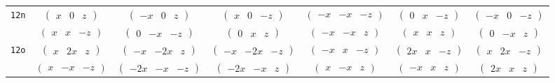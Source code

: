 \documentclass[fleqn,9pt,landscape]{jsarticle}
\begin{document}
\begin{center}
\begin{longtable}{ccccccc}
{\tt 12n} & $ \begin{pmatrix} x & 0 & z \end{pmatrix} $ & $ \begin{pmatrix} - x & 0 & z \end{pmatrix} $ & $ \begin{pmatrix} x & 0 & - z \end{pmatrix} $ & $ \begin{pmatrix} - x & - x & - z \end{pmatrix} $ & $ \begin{pmatrix} 0 & x & - z \end{pmatrix} $ & $ \begin{pmatrix} - x & 0 & - z \end{pmatrix} $ \\
& $ \begin{pmatrix} x & x & - z \end{pmatrix} $ & $ \begin{pmatrix} 0 & - x & - z \end{pmatrix} $ & $ \begin{pmatrix} 0 & x & z \end{pmatrix} $ & $ \begin{pmatrix} - x & - x & z \end{pmatrix} $ & $ \begin{pmatrix} x & x & z \end{pmatrix} $ & $ \begin{pmatrix} 0 & - x & z \end{pmatrix} $ \\ \hline
{\tt 12o} & $ \begin{pmatrix} x & 2 x & z \end{pmatrix} $ & $ \begin{pmatrix} - x & - 2 x & z \end{pmatrix} $ & $ \begin{pmatrix} - x & - 2 x & - z \end{pmatrix} $ & $ \begin{pmatrix} - x & x & - z \end{pmatrix} $ & $ \begin{pmatrix} 2 x & x & - z \end{pmatrix} $ & $ \begin{pmatrix} x & 2 x & - z \end{pmatrix} $ \\
& $ \begin{pmatrix} x & - x & - z \end{pmatrix} $ & $ \begin{pmatrix} - 2 x & - x & - z \end{pmatrix} $ & $ \begin{pmatrix} - 2 x & - x & z \end{pmatrix} $ & $ \begin{pmatrix} x & - x & z \end{pmatrix} $ & $ \begin{pmatrix} - x & x & z \end{pmatrix} $ & $ \begin{pmatrix} 2 x & x & z \end{pmatrix} $ \\ \hline

\end{longtable}
\end{center}
\end{document}
